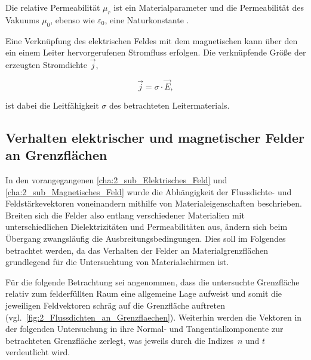 Die relative Permeabilität $\mu_r$ ist ein Materialparameter und die Permeabilität des Vakuums $\mu_0$, ebenso wie $\varepsilon_0$, eine Naturkonstante \cite{EM_Schirmung}.
\par
\vspace{\linespace}
Eine Verknüpfung des elektrischen Feldes mit dem magnetischen kann über den ein einem Leiter hervorgerufenen Stromfluss erfolgen. Die verknüpfende Größe der erzeugten Stromdichte $\vec j$,

\begin{equation}
    \vec j = \sigma \cdot \vec E,
\end{equation}

ist dabei die Leitfähigkeit $\sigma$ des betrachteten Leitermaterials.


\subsection{Verhalten elektrischer und magnetischer Felder an Grenzflächen}\label{cha:2_sub_Verhalten_an_Grenzflächen}

In den vorangegangenen \Abschnitten \ref{cha:2_sub_Elektrisches_Feld} und \ref{cha:2_sub_Magnetisches_Feld} wurde die Abhängigkeit der Flussdichte- und Feldstärkevektoren voneinandern mithilfe von Materialeigenschaften beschrieben. Breiten sich die Felder also entlang verschiedener Materialien mit unterschiedlichen Dielektrizitäten und Permeabilitäten aus, ändern sich beim Übergang zwangsläufig die Ausbreitungsbedingungen. Dies soll im Folgendes betrachtet werden, da das Verhalten der Felder an Materialgrenzflächen grundlegend für die Untersuchtung von Materialschirmen ist. 
\par
\vspace{\linespace}
Für die folgende Betrachtung sei angenommen, dass die untersuchte Grenzfläche relativ zum felderfüllten Raum eine allgemeine Lage aufweist und somit die jeweiligen Feldvektoren schräg auf die Grenzfläche auftreten (vgl.~\Abb \ref{fig:2_Flussdichten_an_Grenzflaechen}). Weiterhin werden die Vektoren in der folgenden Untersuchung in ihre Normal- und Tangentialkomponente zur betrachteten Grenzfläche zerlegt, was jeweils durch die Indizes~$n$ und $t$ verdeutlicht wird. 

